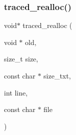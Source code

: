 \mbox{\label{memtrace_8h_ad9b9f054074d56c2952702d341aba982}} 
\subsubsection{traced\+\_\+realloc()}
{\footnotesize\ttfamily void$\ast$ traced\+\_\+realloc (\begin{DoxyParamCaption}\item[{void $\ast$}]{old,  }\item[{size\+\_\+t}]{size,  }\item[{const char $\ast$}]{size\+\_\+txt,  }\item[{int}]{line,  }\item[{const char $\ast$}]{file }\end{DoxyParamCaption})}

